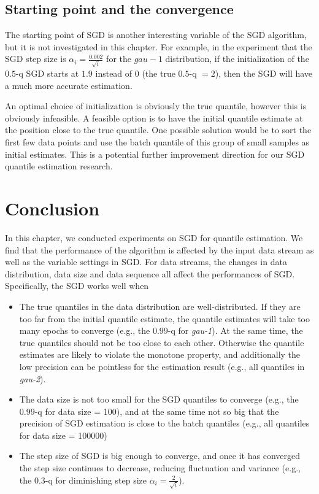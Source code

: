 \subsection{Starting point and the convergence}

The starting point of SGD is another interesting variable of the SGD algorithm, but it is not investigated in this chapter. For example, in the experiment that the SGD step size is $\alpha_i = \frac{0.002}{\sqrt{i}}$ for the $gau-1$ distribution, if the initialization of the $0.5$-q SGD starts at $1.9$ instead of $0$ (the true $0.5$-q $=2$), then the SGD will have a much more accurate estimation.

An optimal choice of initialization is obviously the true quantile, however this is obviously infeasible. A feasible option is to have the initial quantile estimate at the position close to the true quantile. One possible solution would be to sort the first few data points and use the batch quantile of this group of small samples as initial estimates. This is a potential further improvement direction for our SGD quantile estimation research.

\section{Conclusion}
\label{sec: conclusion}
In this chapter, we conducted experiments on SGD for quantile estimation. We find that the performance of the algorithm is affected by the input data stream as well as the variable settings in SGD. For data streams, the changes in data distribution, data size and data sequence all affect the performances of SGD. Specifically, the SGD works well when
\begin{itemize}
    \item The true quantiles in the data distribution are well-distributed. If they are too far from the initial quantile estimate, the quantile estimates will take too many epochs to converge (e.g., the $0.99$-q for \textit{gau-1}).
    At the same time, the true quantiles should not be too close to each other. Otherwise 
    the quantile estimates are likely to violate the monotone property, and additionally the low precision can be pointless for the estimation result (e.g., all quantiles in \textit{gau-2}). 
    
    \item The data size is not too small for the SGD quantiles to converge (e.g., the $0.99$-q for data size = 100), and at the same time not so big that the precision of SGD estimation is close to the batch quantiles (e.g., all quantiles for data size = 100000)
    
    \item The step size of SGD is big enough to converge, and once it has converged the step size continues to decrease, reducing fluctuation and variance (e.g., the $0.3$-q for diminishing step size $\alpha_i = \frac{2}{\sqrt{i}}$).
\end{itemize}

